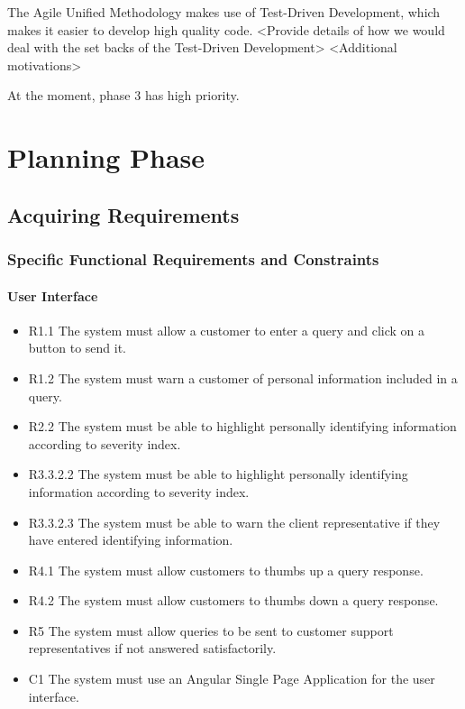 \documentclass[11pt]{article}
\begin{document}
The Agile Unified Methodology makes use of Test-Driven Development, which makes it easier to develop high quality code.
<Provide details of how we would deal with the set backs of the Test-Driven Development>
<Additional motivations>

At the moment, phase 3 has high priority.

\section{Planning Phase}

\subsection{Acquiring Requirements}

\subsubsection{Specific Functional Requirements and Constraints}

\paragraph{User Interface}
\begin{itemize}
  \item[] R1.1 The system must allow a customer to enter a query and click on a button to send it.
  \item[] R1.2 The system must warn a customer of personal information included in a query.
  \item[] R2.2 The system must be able to highlight personally identifying information according to severity index.
  \item[] R3.3.2.2 The system must be able to highlight personally identifying information according to severity index.
  \item[] R3.3.2.3 The system must be able to warn the client representative if they have entered identifying information.
  \item[] R4.1 The system must allow customers to thumbs up a query response.
  \item[] R4.2 The system must allow customers to thumbs down a query response.
  \item[] R5 The system must allow queries to be sent to customer support representatives if not answered satisfactorily.
  \item[] C1 The system must use an Angular Single Page Application for the user interface.
\end{itemize}
\end{document}
